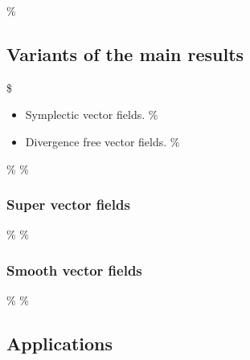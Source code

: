 \documentclass[11pt]{article}
\begin{document}
\begin{eg}
\end{eg}

\%\subsection{Variants of the main results}

\$\begin{itemize}
\%\item Symplectic vector fields.
\%\item Divergence free vector fields.
\%\end{itemize}
\%
\%\subsubsection{Super vector fields}
\%
\%\subsubsection{Smooth vector fields}
\%
\%\subsection{Applications} \label{sec:applications}
\end{document}
